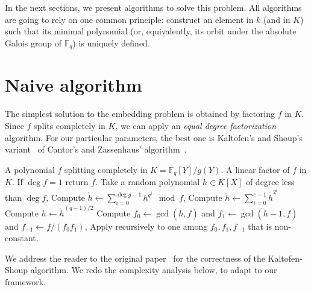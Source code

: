 \documentclass[12pt]{article}
\theoremstyle{plain}
\theoremstyle{definition}
\def\F{\ensuremath{\mathbb{F}}}
\newcounter{algorithm}
\begin{document}
In the next sections, we present algorithms to solve this problem. All
algorithms are going to rely on one common principle: construct an
element in $k$ (and in $K$) such that its minimal polynomial (or,
equivalently, its orbit under the absolute Galois group of $\F_q$) is
uniquely defined.


\section{Naive algorithm}
\label{sec:description-naive}

The simplest solution to the embedding problem is obtained by
factoring $f$ in $K$. Since $f$ splits completely in $K$, we can apply
an \emph{equal degree factorization} algorithm. For our particular
parameters, the best one is Kaltofen's and Shoup's
variant~\cite{kaltofen+shoup97} of Cantor's and Zassenhaus'
algorithm~\cite{cantor1981}.

\begin{algorithm}
  \label{alg:ks}
  \begin{algorithmic}[1]
    \REQUIRE A polynomial $f$ splitting completely in $K=\F_q[Y]/g(Y)$.
    \ENSURE A linear factor of $f$ in $K$.
    \STATE If $\deg f = 1$ return $f$.
    \STATE Take a random polynomial $h\in K[X]$ of degree less than $\deg f$,
    \STATE\label{alg:ks-pseudotrace} Compute $\displaystyle\dot{h} \leftarrow \sum_{i=0}^{\deg g-1} h^{q^i} \mod f$,
    \STATE Compute $\displaystyle\ddot{h} \leftarrow \sum_{i=0}^{e-1} \dot{h}^{2^i}$
    \ELSE
    \STATE Compute $\ddot{h} \leftarrow \dot{h}^{(q-1)/2}$
    \ENDIF
    \STATE Compute $f_0\leftarrow\gcd(\ddot{h},f)$ and $f_1\leftarrow\gcd(\ddot{h}-1,f)$ and $f_{-1}\leftarrow f/(f_0f_1)$,
    \STATE Apply recursively to one among $f_0,f_1,f_{-1}$ that is non-constant.
  \end{algorithmic}
\end{algorithm}

We address the reader to the original paper~\cite{kaltofen+shoup97}
for the correctness of the Kaltofen-Shoup algorithm. We redo the
complexity analysis below, to adapt to our framework.
\end{document}
